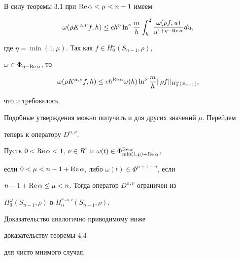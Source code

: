 \begin{pf}


В силу теоремы 3.1 при $\operatorname{Re} \alpha <\mu < n-1$ имеем


$$


\omega(\rho K^{\alpha,\nu} f,h) \leq c h^{\eta} \ln^\nu


\frac{m}{h} \int _h^2 \frac{\omega(\rho f,u)}


{u^{1+\eta-\re \alpha}} du,


$$


где $\eta=\min(1,\mu)$. Так как $f\in H_0^\omega(S_{n-1},\rho)$,


$\omega\in\Phi_{\eta-\operatorname{Re} \alpha}$, то


$$


\omega(\rho K^{\alpha,\nu}f,h)\le


ch^{\re \alpha}\omega(h)\ln^\nu


\frac{m}{h}\|\rho f\|_{H_0^\omega(S_{n-1})},


$$


что и требовалось.


\end{pf}





Подобные утверждения можно получить и для других значений $\mu$. Перейдем


теперь к оператору $D^{\alpha,\nu}$.





\begin{thms}


Пусть $0 < \re \alpha < 1$, $\nu\in R^1$ и $\omega(t) \in


\Phi_{\min(1,\mu)+\re \alpha}^{\re\alpha}$,


если $0 <\mu < n-1+\operatorname{Re} \alpha$, либо $\omega(t) \in \Phi^{\mu+1-n}$, если


$n-1+\operatorname{Re} \alpha \le \mu < n$. Тогда оператор $D^{\alpha,\nu}$ ограничен из


$H_0^\omega(S_{n-1},\rho)$ в $H_0^{\omega_{-\alpha,\nu}}(S_{n-1},\rho)$.


\end{thms}





Доказательство аналогично приводимому ниже


доказательству теоремы 4.4


для чисто мнимого случая.





